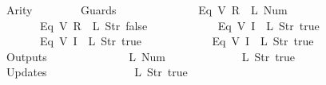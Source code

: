 \begin{isabellebody}
\ \ \ \ \ \ Arity\ {\isacharequal}\ {}{\isacharcomma}\isanewline
\ \ \ \ \ \ Guards\ {\isacharequal}\ {\isacharbrackleft}\isanewline
\ \ \ \ \ \ \ \ \ \ \ \ {\isacharparenleft}Eq\ {\isacharparenleft}V\ {\isacharparenleft}R\ {}{\isacharparenright}{\isacharparenright}\ {\isacharparenleft}L\ {\isacharparenleft}Num\ {}{\isacharparenright}{\isacharparenright}{\isacharparenright}{\isacharcomma}\isanewline
\ \ \ \ \ \ \ \ \ \ \ \ {\isacharparenleft}Eq\ {\isacharparenleft}V\ {\isacharparenleft}R\ {}{\isacharparenright}{\isacharparenright}\ {\isacharparenleft}L\ {\isacharparenleft}Str\ {\isacharprime}{\isacharprime}false{\isacharprime}{\isacharprime}{\isacharparenright}{\isacharparenright}{\isacharparenright}{\isacharcomma}\isanewline
\ \ \ \ \ \ \ \ \ \ \ \ {\isacharparenleft}Eq\ {\isacharparenleft}V\ {\isacharparenleft}I\ {}{\isacharparenright}{\isacharparenright}\ {\isacharparenleft}L\ {\isacharparenleft}Str\ {\isacharprime}{\isacharprime}true{\isacharprime}{\isacharprime}{\isacharparenright}{\isacharparenright}{\isacharparenright}{\isacharcomma}\isanewline
\ \ \ \ \ \ \ \ \ \ \ \ {\isacharparenleft}Eq\ {\isacharparenleft}V\ {\isacharparenleft}I\ {}{\isacharparenright}{\isacharparenright}\ {\isacharparenleft}L\ {\isacharparenleft}Str\ {\isacharprime}{\isacharprime}true{\isacharprime}{\isacharprime}{\isacharparenright}{\isacharparenright}{\isacharparenright}{\isacharcomma}\isanewline
\ \ \ \ \ \ \ \ \ \ \ \ {\isacharparenleft}Eq\ {\isacharparenleft}V\ {\isacharparenleft}I\ {}{\isacharparenright}{\isacharparenright}\ {\isacharparenleft}L\ {\isacharparenleft}Str\ {\isacharprime}{\isacharprime}true{\isacharprime}{\isacharprime}{\isacharparenright}{\isacharparenright}{\isacharparenright}\isanewline
\ \ \ \ \ \ {\isacharbrackright}{\isacharcomma}\isanewline
\ \ \ \ \ \ Outputs\ {\isacharequal}\ {\isacharbrackleft}\isanewline
\ \ \ \ \ \ \ \ \ \ \ \ {\isacharparenleft}L\ {\isacharparenleft}Num\ {}{\isacharparenright}{\isacharparenright}{\isacharcomma}\isanewline
\ \ \ \ \ \ \ \ \ \ \ \ {\isacharparenleft}L\ {\isacharparenleft}Str\ {\isacharprime}{\isacharprime}true{\isacharprime}{\isacharprime}{\isacharparenright}{\isacharparenright}\isanewline
\ \ \ \ \ \ {\isacharbrackright}{\isacharcomma}\isanewline
\ \ \ \ \ \ Updates\ {\isacharequal}\ {\isacharbrackleft}\isanewline
\ \ \ \ \ \ \ \ \ \ \ \ {\isacharparenleft}{}{\isacharcomma}\ {\isacharparenleft}L\ {\isacharparenleft}Str\ {\isacharprime}{\isacharprime}true{\isacharprime}{\isacharprime}{\isacharparenright}{\isacharparenright}{\isacharparenright}{\isacharcomma}\isanewline

\end{isabellebody}
